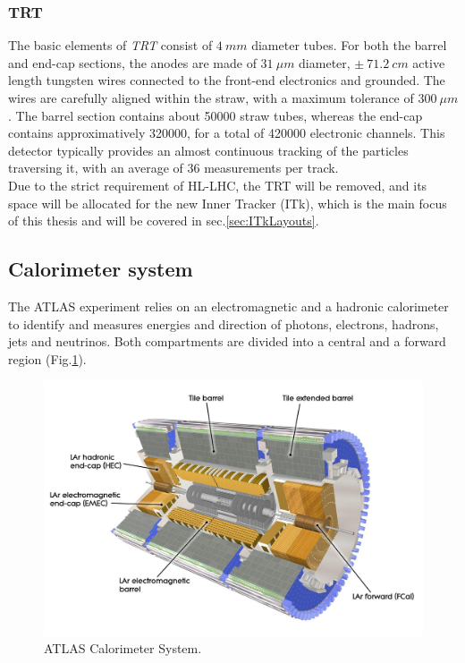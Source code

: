 \documentclass[a4paper,twoside,12pt]{article}
\begin{document}
\subsubsection*{TRT}
The basic elements of \textit{TRT} consist of $4\ mm$ diameter tubes\cite{Aad:2008zzm}. For both the barrel
and end-cap sections, the anodes are made of $31\ \mu m$ diameter, $\pm\ 71.2\ cm$ 
active length tungsten wires 
connected to the front-end electronics and grounded. The wires are carefully aligned within
the straw, with a maximum tolerance of $300\ \mu m$. The barrel section contains about 
50000 straw tubes, whereas the end-cap contains approximatively 320000,
for a total of 420000 electronic channels\cite{ATLAS:1997ag}. This detector typically provides
an almost continuous tracking of the particles traversing it, with an average of 36 measurements per track.\\

Due to the strict requirement of HL-LHC, the TRT will be removed, and its space will be allocated for the new
Inner Tracker (ITk), which is the main focus of this thesis and will be covered in sec.\ref{sec:ITkLayouts}.


\subsection{Calorimeter system}

The ATLAS experiment  relies on an electromagnetic and a hadronic calorimeter to identify and measures energies and direction of photons, electrons, hadrons, jets and neutrinos. 
Both compartments are divided into a central and a forward region (Fig.\ref{fig:current_Cals}).

\begin{figure} [h]
	\includegraphics[width=\textwidth]{current_Cals}
	\caption{ATLAS Calorimeter System.}
	\label{fig:current_Cals}
\end{figure}
\end{document}
